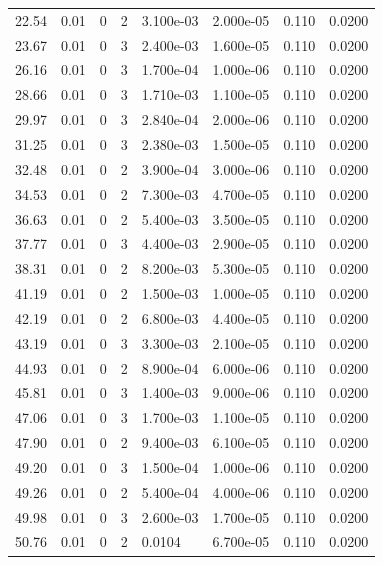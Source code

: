 \documentclass[preview]{standalone}
\begin{document}
{{\begin{tabular}{L{1.2cm}C{1.2cm} C{0.3cm}C{0.5cm} C{1.4cm}C{1.4cm} C{1.4cm}C{1.4cm}}
  22.54  &  0.01  & 0     &  2 &  3.100e-03  & 2.000e-05  & 0.110 &  0.0200   \\ 
  23.67  &  0.01  & 0     &  3 &  2.400e-03  & 1.600e-05  & 0.110 &  0.0200   \\ 
  26.16  &  0.01  & 0     &  3 &  1.700e-04  & 1.000e-06  & 0.110 &  0.0200   \\ 
  28.66  &  0.01  & 0     &  3 &  1.710e-03  & 1.100e-05  & 0.110 &  0.0200   \\ 
  29.97  &  0.01  & 0     &  3 &  2.840e-04  & 2.000e-06  & 0.110 &  0.0200   \\ 
  31.25  &  0.01  & 0     &  3 &  2.380e-03  & 1.500e-05  & 0.110 &  0.0200   \\ 
  32.48  &  0.01  & 0     &  2 &  3.900e-04  & 3.000e-06  & 0.110 &  0.0200   \\ 
  34.53  &  0.01  & 0     &  2 &  7.300e-03  & 4.700e-05  & 0.110 &  0.0200   \\ 
  36.63  &  0.01  & 0     &  2 &  5.400e-03  & 3.500e-05  & 0.110 &  0.0200   \\ 
  37.77  &  0.01  & 0     &  3 &  4.400e-03  & 2.900e-05  & 0.110 &  0.0200   \\ 
  38.31  &  0.01  & 0     &  2 &  8.200e-03  & 5.300e-05  & 0.110 &  0.0200   \\ 
  41.19  &  0.01  & 0     &  2 &  1.500e-03  & 1.000e-05  & 0.110 &  0.0200   \\ 
  42.19  &  0.01  & 0     &  2 &  6.800e-03  & 4.400e-05  & 0.110 &  0.0200   \\ 
  43.19  &  0.01  & 0     &  3 &  3.300e-03  & 2.100e-05  & 0.110 &  0.0200   \\ 
  44.93  &  0.01  & 0     &  2 &  8.900e-04  & 6.000e-06  & 0.110 &  0.0200   \\ 
  45.81  &  0.01  & 0     &  3 &  1.400e-03  & 9.000e-06  & 0.110 &  0.0200   \\ 
  47.06  &  0.01  & 0     &  3 &  1.700e-03  & 1.100e-05  & 0.110 &  0.0200   \\ 
  47.90  &  0.01  & 0     &  2 &  9.400e-03  & 6.100e-05  & 0.110 &  0.0200   \\ 
  49.20  &  0.01  & 0     &  3 &  1.500e-04  & 1.000e-06  & 0.110 &  0.0200   \\ 
  49.26  &  0.01  & 0     &  2 &  5.400e-04  & 4.000e-06  & 0.110 &  0.0200   \\ 
  49.98  &  0.01  & 0     &  3 &  2.600e-03  & 1.700e-05  & 0.110 &  0.0200   \\ 
  50.76  &  0.01  & 0     &  2 &  0.0104  & 6.700e-05  & 0.110 &  0.0200   \\ 

\end{tabular}}}
\end{document}
